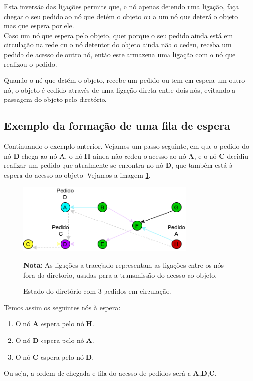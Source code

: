 Esta inversão das ligações permite que, o nó apenas detendo uma ligação, faça chegar o seu pedido ao nó que detém o objeto ou a um nó que deterá o objeto mas que espera por ele. \\




Caso um nó que espera pelo objeto, quer porque o seu pedido ainda está em circulação na rede ou o nó detentor do objeto ainda não o cedeu, receba um pedido de acesso de outro nó, então este armazena uma ligação com o nó que realizou o pedido.

Quando o nó que detém o objeto, recebe um pedido ou tem em espera um outro nó, o objeto é cedido através de uma ligação direta entre dois nós, evitando a passagem do objeto pelo diretório.


\subsection*{Exemplo da formação de uma fila de espera}

Continuando o exemplo anterior. Vejamos um passo seguinte, em que o pedido do nó \textbf{D} chega ao nó \textbf{A}, o nó \textbf{H} ainda não cedeu o acesso ao nó \textbf{A}, e o nó \textbf{C} decidiu realizar um pedido que atualmente se encontra no nó \textbf{D}, que também está à espera do acesso ao objeto. Vejamos a imagem \ref{motivacao:img:3_pedidos}.

\begin{figure}[!htb]
\centering
\includegraphics[width=250pt]{fila.png}
\caption{Estado do diretório com 3 pedidos em circulação.}
\label{motivacao:img:3_pedidos}
\textbf{Nota:} As ligações a tracejado representam as ligações entre os nós fora do diretório, usadas para a transmissão do acesso ao objeto.
\end{figure}


Temos assim os seguintes nós à espera:
\begin{enumerate}
    \item O nó \textbf{A} espera pelo nó \textbf{H}.
    \item O nó \textbf{D} espera pelo nó \textbf{A}.
    \item O nó \textbf{C} espera pelo nó \textbf{D}.
\end{enumerate}
Ou seja, a ordem de chegada e fila do acesso de pedidos será a \textbf{A},\textbf{D},\textbf{C}. \\


